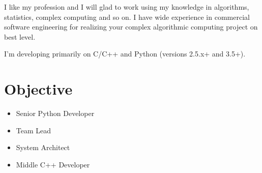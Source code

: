 \documentclass[letterpaper,11pt]{article}
\begin{document}
I like my profession and I will glad to work using my knowledge in algorithms, statistics, complex computing and so on. I have wide experience in commercial software engineering for realizing your complex algorithmic computing project on best level.

I'm developing primarily on C/C++ and Python (versions 2.5.x+ and 3.5+).


\section{Objective}
  \begin{itemize}
    \item Senior Python Developer
    \item Team Lead
    \item System Architect
    \item Middle C++ Developer
  \end{itemize}


\end{document}
